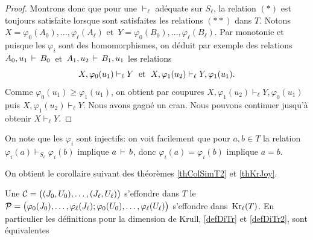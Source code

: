 \begin{proof}
\noindent Montrons donc que pour une \entrel $\vdash_\ell$ adéquate sur  $S_\ell$,
la relation $(*)$ est toujours
satisfaite lorsque sont satisfaites les relations $(**)$ dans $T$.
Notons $X=\varphi_0(A_0),\ldots,\varphi_\ell(A_\ell)$ \hbox{et $Y=\varphi_0(B_0),\ldots,\varphi_\ell(B_\ell)$}. Par monotonie
et puisque les $\varphi_i$ sont des homomorphismes,	on déduit  par exemple des relations $A_0,u_1\,\vdash\, B_0\,$ et  $\,A_1,u_2\,\vdash\, B_1,u_1$ les relations
$$
X,\varphi_0(u_1)\vdash_\ell Y\;\hbox{  et  }\;X,\varphi_1(u_2)\vdash_\ell Y,\varphi_1(u_1)
.$$
Comme $\varphi_0(u_1)\geq \varphi_1(u_1) $, on obtient
par coupures $X,\varphi_1(u_2)\vdash_\ell Y,\varphi_0(u_1)$ puis $X,\varphi_1(u_2)\vdash_\ell Y$. Nous avons gagné un cran. Nous pouvons continuer jusqu'à obtenir $X\vdash_\ell Y$. 
\end{proof}

On note que les \homos $\varphi_i$ sont injectifs: on voit facilement que
pour $a,b \in T$ la relation $\varphi_i(a)\vdash_{S_\ell}\varphi_i(b)$ implique
$a\,\vdash\, b$, donc $\varphi_i(a)=\varphi_i(b)$ implique $a=b$.

\smallskip 
On obtient le corollaire suivant des théorèmes
\ref{thColSimT2} et \ref{thKrJoy}.


\begin{corollary} \label{corthKrJoy}
Une \proc ${\cal C}=\big((J_0,U_0),\ldots,(J_\ell,U_\ell)\big)$ s'effondre dans $T$ \ssi le \proi
 ${\cal P}=\big(\varphi_0(J_0),\ldots,\varphi_\ell(J_\ell);
\varphi_0(U_0),\ldots,\varphi_\ell(U_\ell)\big)$
s'effondre dans $\,{\rm Kr}_\ell(T)$. En particulier les définitions
\covs pour la dimension de Krull, \ref{defDiTr} et \ref{defDiTr2}, sont équivalentes
\end{corollary}

